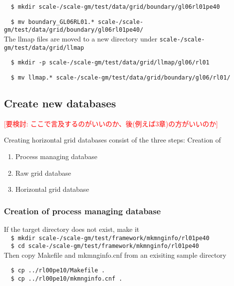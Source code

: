 \verb|  $ mkdir scale-|{\version}\verb|/scale-gm/test/data/grid/boundary/gl06rl01pe40|

\verb|  $ mv boundary_GL06RL01.* scale-|{\version}\verb|/scale-gm/test/data/grid/boundary/gl06rl01pe40/|
\\

\noindent The llmap files are moved to a new directory under
\texttt{scale-{\version}/scale-gm/test/data/grid/llmap}

\verb|  $ mkdir -p scale-|{\version}\verb|/scale-gm/test/data/grid/llmap/gl06/rl01|

\verb|  $ mv llmap.* scale-|{\version}\verb|/scale-gm/test/data/grid/boundary/gl06/rl01/| \\


\subsection{Create new databases}
\textcolor{red}{[要検討: ここで言及するのがいいのか、後(例えば3章)の方がいいのか]}

Creating horizontal grid databases consist of the three steps: Creation of
\begin{enumerate}
  \item Process managing database
  \item Raw grid database
  \item Horizontal grid database
\end{enumerate}

\subsubsection{Creation of process managing database}

If the target directory does not exist, make it \\

\verb|  $ mkdir scale-|{\version}\verb|/scale-gm/test/framework/mkmnginfo/rl01pe40| \\

\verb|  $ cd scale-|{\version}\verb|/scale-gm/test/framework/mkmnginfo/rl01pe40| \\

Then copy Makefile and mkmnginfo.cnf from an exisiting sample directory
\begin{verbatim}
  $ cp ../rl00pe10/Makefile .
  $ cp ../rl00pe10/mkmnginfo.cnf .
\end{verbatim}


